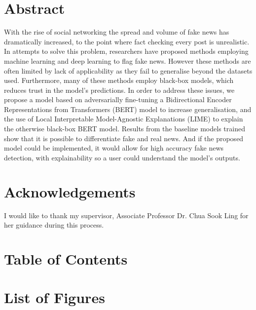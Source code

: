 \documentclass[stu,12pt,floatsintext,donotrepeattitle]{apa7}
\begin{document}
\section*{Abstract}
With the rise of social networking the spread and volume of fake news has dramatically increased, to the point where fact checking every post is unrealistic. In attempts to solve this problem, researchers have proposed methods employing machine learning and deep learning to flag fake news. However these methods are often limited by lack of applicability as they fail to generalise beyond the datasets used. Furthermore, many of these methods employ black-box models, which reduces trust in the model's predictions. In order to address these issues, we propose a model based on adversarially fine-tuning a Bidirectional Encoder Representations from Transformers (BERT) model to increase generalisation, and the use of Local Interpretable Model-Agnostic Explanations (LIME) to explain the otherwise black-box BERT model. Results from the baseline models trained show that it is possible to differentiate fake and real news. And if the proposed model could be implemented, it would allow for high accuracy fake news detection, with explainability so a user could understand the model's outputs. 

\clearpage
\section*{Acknowledgements}
I would like to thank my supervisor, Associate Professor Dr. Chua Sook Ling for her guidance during this process.

\clearpage
\begingroup
\titlespacing*{\section}{0pt}{0pt}{6pt}
\section*{Table of Contents}
\renewcommand{\contentsname}{}
\tableofcontents
\endgroup

\clearpage
\begingroup
\titlespacing*{\section}{0pt}{0pt}{6pt}
\section*{List of Figures}
\renewcommand{\listfigurename}{}
\listoffigures
\endgroup
\end{document}
